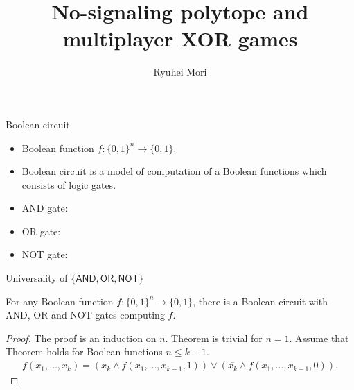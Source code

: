 \documentclass{beamer}
\title{No-signaling polytope and multiplayer XOR games}
\author{Ryuhei Mori}
\institute{Tokyo Institute of Technology}
\newcommand\emm[1]{\textcolor{redorange}{{#1}}}
\begin{document}
\begin{frame}[plain]
\maketitle
\end{frame}



\begin{frame}{Boolean circuit}
\begin{itemize}
\setlength{\itemsep}{2em}
\item Boolean function $f\colon \{0,1\}^n\to\{0,1\}$.
\item \emm{Boolean circuit} is a model of computation of a Boolean functions which consists of logic \emm{gates}.
\item AND gate:
\item OR gate:
\item NOT gate:
\end{itemize}
\end{frame}

\begin{frame}{Universality of $\{\mathsf{AND}, \mathsf{OR},\mathsf{NOT}\}$}
\begin{theorem}
For \emm{any} Boolean function $f\colon \{0,1\}^n\to\{0,1\}$, there is a Boolean circuit with AND, OR and NOT gates computing $f$.
\end{theorem}
\begin{proof}
The proof is an induction on $n$. Theorem is trivial for $n=1$.
Assume that Theorem holds for Boolean functions $n \le k-1$.
\begin{align*}
f(x_1,\dotsc,x_k) = (x_k \wedge f(x_1,\dotsc,x_{k-1}, 1)) \vee (\overline{x_k} \wedge f(x_1,\dotsc,x_{k-1}, 0)).
\end{align*}
\end{proof}
\end{frame}
\end{document}
